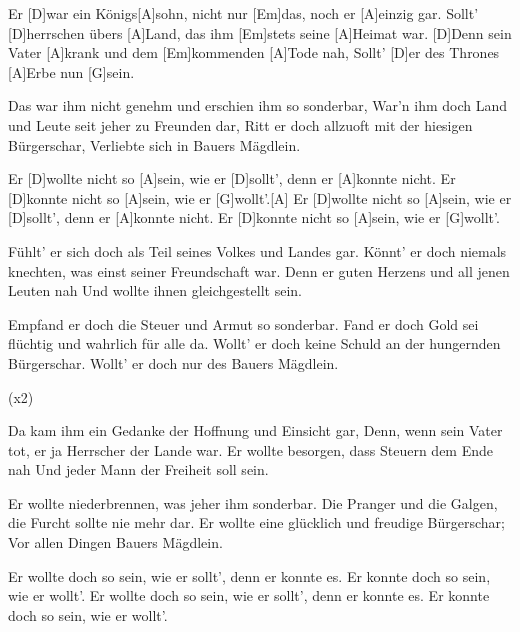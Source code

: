 

\begin{guitar}
	Er [D]war ein Königs[A]sohn, nicht nur [Em]das, noch er [A]einzig gar.
	Sollt' [D]herrschen übers [A]Land, das ihm [Em]stets seine [A]Heimat war.
	[D]Denn sein Vater [A]krank und dem [Em]kommenden [A]Tode nah,
	Sollt' [D]er des Thrones [A]Erbe nun [G]sein.
	
	Das war ihm nicht genehm und erschien ihm so sonderbar,
	War'n ihm doch Land und Leute seit jeher zu Freunden dar,
	Ritt er doch allzuoft mit der hiesigen Bürgerschar,
	Verliebte sich in Bauers Mägdlein.
	
	Er [D]wollte nicht so [A]sein, wie er [D]sollt', denn er [A]konnte nicht.
	Er [D]konnte nicht so [A]sein, wie er [G]wollt'.[A]{}
	Er [D]wollte nicht so [A]sein, wie er [D]sollt', denn er [A]konnte nicht.
	Er [D]konnte nicht so [A]sein, wie er [G]wollt'.
	
	Fühlt' er sich doch als Teil seines Volkes und Landes gar.
	Könnt' er doch niemals knechten, was einst seiner Freundschaft war.
	Denn er guten Herzens und all jenen Leuten nah
	Und wollte ihnen gleichgestellt sein.
	
	Empfand er doch die Steuer und Armut so sonderbar.
	Fand er doch Gold sei flüchtig und wahrlich für alle da.
	Wollt' er doch keine Schuld an der hungernden Bürgerschar.
	Wollt' er doch nur des Bauers Mägdlein.
	
	  (x2)
	
	\pagebreak
	
	Da kam ihm ein Gedanke der Hoffnung und Einsicht gar,
	Denn, wenn sein Vater tot, er ja Herrscher der Lande war.
	Er wollte besorgen, dass Steuern dem Ende nah
	Und jeder Mann der Freiheit soll sein.
	
	Er wollte niederbrennen, was jeher ihm sonderbar.
	Die Pranger und die Galgen, die Furcht sollte nie mehr dar.
	Er wollte eine glücklich und freudige Bürgerschar;
	Vor allen Dingen Bauers Mägdlein.
	
	Er wollte doch so sein, wie er sollt', denn er konnte es.
	Er konnte doch so sein, wie er wollt'.
	Er wollte doch so sein, wie er sollt', denn er konnte es.
	Er konnte doch so sein, wie er wollt'.	
	

\end{guitar}
